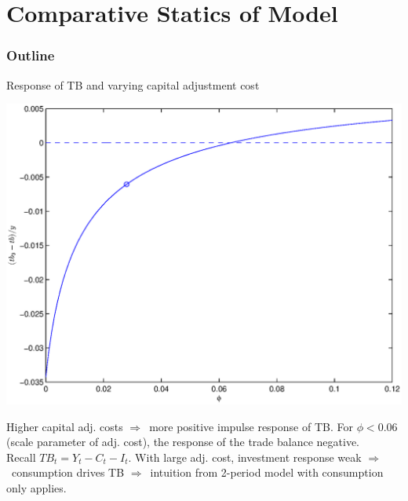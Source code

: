 \documentclass{beamer}
\newcommand{\rarr}{$\Rightarrow$\ }
\begin{document}
\section{Comparative Statics of Model}

\begin{frame}
\frametitle{Outline}
\tableofcontents[currentsection]
\end{frame}


\begin{frame}{Response of TB and varying capital adjustment cost}

\begin{center}
\includegraphics[width = 0.7\linewidth]{FIGURES/soe_rbc_irtbys_phi_slides.eps} 
\end{center}
\vspace{-0.5cm}
Higher capital adj. costs \rarr more positive impulse response of TB. For $\phi<0.06$ (scale parameter of adj. cost), the response of the trade balance negative.
\\
Recall $TB_t = Y_t - C_t - I_t$. With large adj. cost, investment response weak \rarr consumption drives TB \rarr intuition from 2-period model with consumption only applies.

\end{frame}
\end{document}

